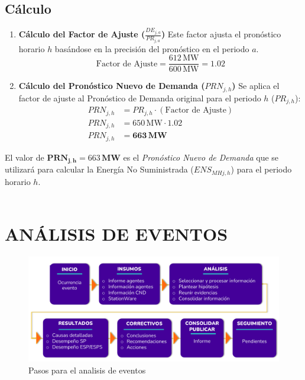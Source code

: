 \documentclass[a5paper]{book}%
\begin{document}
\subsection*{Cálculo}

\begin{enumerate}
	\item \textbf{Cálculo del Factor de Ajuste ($\frac{DE_{j,a}}{PR_{j,a}}$)}
	Este factor ajusta el pronóstico horario $h$ basándose en la precisión del pronóstico en el periodo $a$.
	\begin{equation*}
		\text{Factor de Ajuste} = \frac{612 \, \text{MW}}{600 \, \text{MW}} = 1.02
	\end{equation*}
	
	\item \textbf{Cálculo del Pronóstico Nuevo de Demanda ($PRN_{j,h}$)}
	Se aplica el factor de ajuste al Pronóstico de Demanda original para el periodo $h$ ($PR_{j,h}$):
	\begin{align*}
		PRN_{j,h} &= PR_{j,h} \cdot (\text{Factor de Ajuste}) \\
		PRN_{j,h} &= 650 \, \text{MW} \cdot 1.02 \\
		PRN_{j,h} &= \mathbf{663 \, \text{MW}}
	\end{align*}
\end{enumerate}

El valor de $\mathbf{PRN_{j,h}} = 663 \, \mathbf{MW}$ es el \textit{Pronóstico Nuevo de Demanda} que se utilizará para calcular la Energía No Suministrada ($ENS_{MHj,h}$) para el periodo horario $h$.\\\\

\section{ANÁLISIS DE EVENTOS}

\begin{figure}[H]
	\centering
	\caption{Pasos para el analisis de eventos}
	\label{fig:analisiseventosxm}
	\includegraphics[width=0.9\linewidth]{analisis_eventos_xm}
\end{figure}
\end{document}
